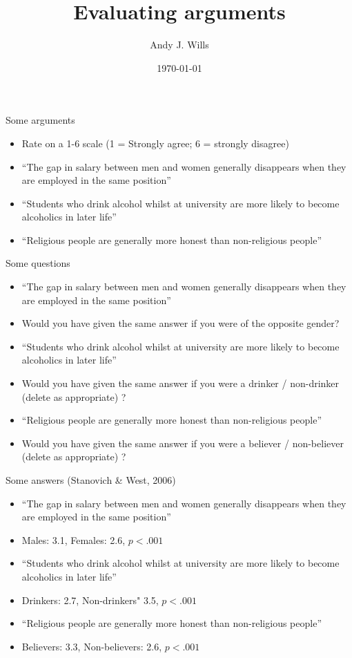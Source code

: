 \documentclass{beamer}
\title[Critical Thinking]{Evaluating arguments}
\author{Andy J. Wills}
\date{\today}
\begin{document}
\frame{\titlepage}

\begin{frame}{Some arguments}
\begin{itemize}
\item Rate on a 1-6 scale (1 = Strongly agree; 6 = strongly disagree)
\item ``The gap in salary between men and women generally disappears when they are employed in the same position''
\item ``Students who drink alcohol whilst at university are more likely to become alcoholics in later life''
\item ``Religious people are generally more honest than non-religious people''
\end{itemize}
\end{frame}

\begin{frame}{Some questions}
\begin{itemize}
\item ``The gap in salary between men and women generally disappears when they are employed in the same position''
\item Would you have given the same answer if you were of the opposite gender?
\item ``Students who drink alcohol whilst at university are more likely to become alcoholics in later life''
\item Would you have given the same answer if you were a drinker / non-drinker (delete as appropriate) ?
\item ``Religious people are generally more honest than non-religious people''
\item Would you have given the same answer if you were a believer / non-believer (delete as appropriate) ?
\end{itemize}
\end{frame}

\begin{frame}{Some answers (Stanovich \& West, 2006)}
\begin{itemize}
\item ``The gap in salary between men and women generally disappears when they are employed in the same position''
\item Males: 3.1, Females: 2.6, $p<.001$
\item ``Students who drink alcohol whilst at university are more likely to become alcoholics in later life''
\item Drinkers: 2.7, Non-drinkers" 3.5, $p<.001$
\item ``Religious people are generally more honest than non-religious people''
\item Believers: 3.3, Non-believers: 2.6, $p<.001$
\end{itemize}
\end{frame}
\end{document}
